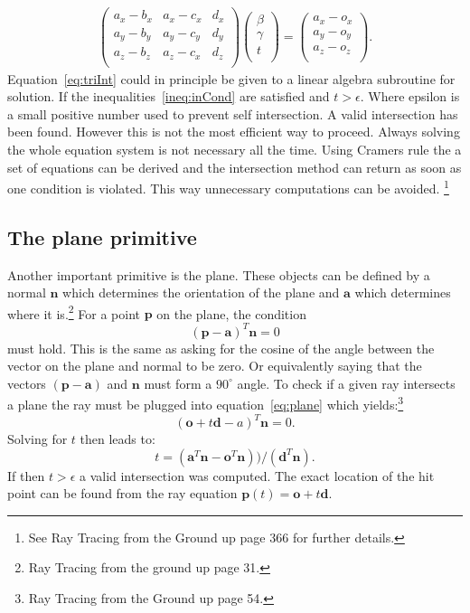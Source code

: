 \begin{align}
\begin{pmatrix}
a_x - b_x & a_x - c_x & d_x \\
a_y - b_y & a_y - c_y & d_y \\
a_z - b_z & a_z - c_x & d_z \\
\end{pmatrix}
\begin{pmatrix}
\beta \\ \gamma \\ t \\
\end{pmatrix}
= 
\begin{pmatrix}
a_x - o_x \\
a_y - o_y \\
a_z - o_z \\
\end{pmatrix}.
\label{eq:triInt}
\end{align}
Equation~\ref{eq:triInt} could in principle be given to a linear algebra subroutine for solution. If the inequalities~\ref{ineq:inCond} are satisfied and $t > \epsilon$. Where epsilon is a small positive number used to prevent self intersection. A valid intersection has been found. However this
is not the most efficient way to proceed. Always solving the whole equation system is not necessary all the time.
Using Cramers rule the a set of equations can be derived and the intersection method can return as soon as one 
condition is violated. This way unnecessary computations can be avoided. \footnote{See Ray Tracing from the Ground up page 366 for further details.}

\subsection{The plane primitive}
Another important primitive is the plane. These objects can be defined by a normal $\mathbf{n}$ which determines the orientation of the plane and $\mathbf{a}$ which determines where it is.\footnote{Ray Tracing from the ground up page 31.} 
For a point $\mathbf{p}$ on the plane, the condition 
\begin{equation}
(\mathbf{p} - \mathbf{a})^T  \mathbf{n} = 0
\label{eq:plane}
\end{equation} 
must hold. This is the same as asking for the cosine of the angle between the vector on the plane and normal to be zero. Or equivalently saying that the vectors $(\mathbf{p} - \mathbf{a})$ and $\mathbf{n}$ must form a $90^{\circ}$ angle. To check if a given ray intersects a plane the ray must be plugged into equation~\ref{eq:plane} which yields:\footnote{Ray Tracing from the Ground up page 54.}
\begin{equation}
(\mathbf{o} + t\mathbf{d} - a)^T \mathbf{n} = 0.
\end{equation}
Solving for $t$ then leads to:
\begin{equation}
t = (\mathbf{a}^T\mathbf{n} -  \mathbf{o}^T\mathbf{n}) ) / (\mathbf{d}^T \mathbf{n}).
\end{equation}
If then $ t > \epsilon$ a valid intersection was computed. The exact location of the hit point can be found from the ray equation $\mathbf{p}(t) = \mathbf{o} + t\mathbf{d}$. 

